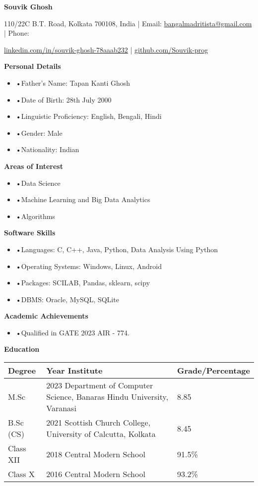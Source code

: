 \documentclass[a4paper,10pt]{article}
\newcommand{\resitem}[1]{\item #1}
\newcommand{\resheading}[1]{\vspace{0.5em} {\small \colorbox{mygrey}{{\begin{minipage}{0.975\textwidth}{{\textbf{#1}}}\end{minipage}}}} \vspace{0.5em}}
\begin{document}
\begin{center} \Large{\textbf{Souvik Ghosh}} \end{center}

\vspace{2pt}

\begin{center} 110/22C B.T. Road, Kolkata 700108, India | Email: \href{mailto:bangalmadritista@gmail.com}{bangalmadritista@gmail.com} | Phone:  \end{center}

\begin{center} \href{https://www.linkedin.com/in/souvik-ghosh-78aaab232}{linkedin.com/in/souvik-ghosh-78aaab232} | \href{https://github.com/Souvik-prog}{github.com/Souvik-prog} \end{center}

\resheading{Personal Details}
\begin{itemize}[nosep]
    \resitem{•Father’s Name: Tapan Kanti Ghosh}
    \resitem{•Date of Birth: 28th July 2000}
    \resitem{•Linguistic Proficiency: English, Bengali, Hindi}
    \resitem{•Gender: Male}
    \resitem{•Nationality: Indian}
\end{itemize}

\resheading{Areas of Interest}
\begin{itemize}[nosep]
    \resitem{•Data Science}
    \resitem{•Machine Learning and Big Data Analytics}
    \resitem{•Algorithms}
\end{itemize}

\resheading{Software Skills}
\begin{itemize}[nosep]
    \resitem{•Languages: C, C++, Java, Python, Data Analysis Using Python}
    \resitem{•Operating Systems: Windows, Linux, Android}
    \resitem{•Packages: SCILAB, Pandas, sklearn, scipy}
    \resitem{•DBMS: Oracle, MySQL, SQLite}
\end{itemize}

\resheading{Academic Achievements}
\begin{itemize}[nosep]
    \resitem{•Qualified in GATE 2023 AIR - 774.}
\end{itemize}

\resheading{Education}
\begin{tabularx}{\textwidth}{lX}
\textbf{Degree} & \textbf{Year Institute} & \textbf{Grade/Percentage} \\
\hline
M.Sc & 2023 Department of Computer Science, Banaras Hindu University, Varanasi & 8.85 \\
B.Sc (CS) & 2021 Scottish Church College, University of Calcutta, Kolkata & 8.45 \\
Class XII & 2018 Central Modern School & 91.5\% \\
Class X & 2016 Central Modern School & 93.2\% \\
\end{tabularx}
\end{document}
